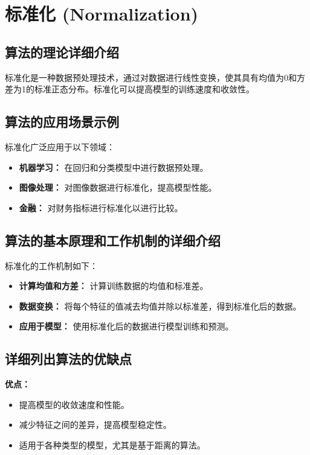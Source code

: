 \section{标准化 (Normalization)}
\subsection*{算法的理论详细介绍}
标准化是一种数据预处理技术，通过对数据进行线性变换，使其具有均值为0和方差为1的标准正态分布。标准化可以提高模型的训练速度和收敛性。

\subsection*{算法的应用场景示例}
标准化广泛应用于以下领域：
\begin{itemize}
    \item \textbf{机器学习：} 在回归和分类模型中进行数据预处理。
    \item \textbf{图像处理：} 对图像数据进行标准化，提高模型性能。
    \item \textbf{金融：} 对财务指标进行标准化以进行比较。
\end{itemize}

\subsection*{算法的基本原理和工作机制的详细介绍}
标准化的工作机制如下：
\begin{itemize}
    \item \textbf{计算均值和方差：} 计算训练数据的均值和标准差。
    \item \textbf{数据变换：} 将每个特征的值减去均值并除以标准差，得到标准化后的数据。
    \item \textbf{应用于模型：} 使用标准化后的数据进行模型训练和预测。
\end{itemize}

\subsection*{详细列出算法的优缺点}
\textbf{优点：}
\begin{itemize}
    \item 提高模型的收敛速度和性能。
    \item 减少特征之间的差异，提高模型稳定性。
    \item 适用于各种类型的模型，尤其是基于距离的算法。
\end{itemize}

